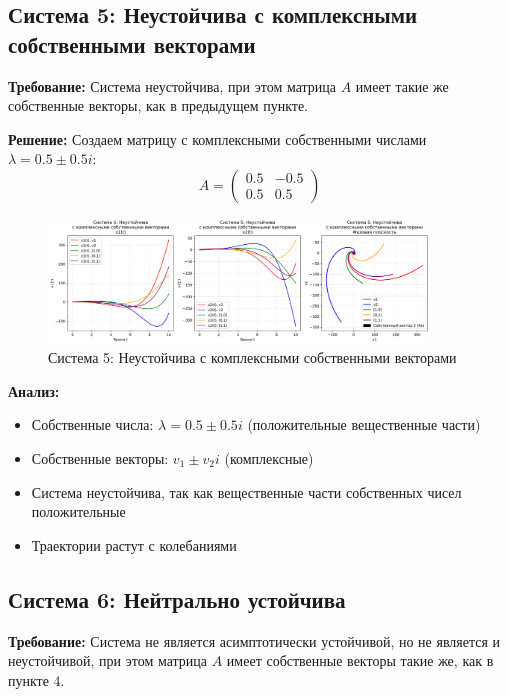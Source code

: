 \subsection*{Система 5: Неустойчива с комплексными собственными векторами}

\textbf{Требование:} Система неустойчива, при этом матрица $A$ имеет такие же собственные векторы, как в предыдущем пункте.

\textbf{Решение:} Создаем матрицу с комплексными собственными числами $\lambda = 0.5 \pm 0.5i$:
\begin{equation}
A = \begin{pmatrix} 0.5 & -0.5 \\ 0.5 & 0.5 \end{pmatrix}
\end{equation}

\begin{figure}[H]
    \centering
    \includegraphics[width=0.9\textwidth]{images/task1/system5_unstable_complex.png}
    \caption{Система 5: Неустойчива с комплексными собственными векторами}
\end{figure}

\textbf{Анализ:}
\begin{itemize}
    \item Собственные числа: $\lambda = 0.5 \pm 0.5i$ (положительные вещественные части)
    \item Собственные векторы: $v_1 \pm v_2 i$ (комплексные)
    \item Система неустойчива, так как вещественные части собственных чисел положительные
    \item Траектории растут с колебаниями
\end{itemize}

\subsection*{Система 6: Нейтрально устойчива}

\textbf{Требование:} Система не является асимптотически устойчивой, но не является и неустойчивой, при этом матрица $A$ имеет собственные векторы такие же, как в пункте 4.

